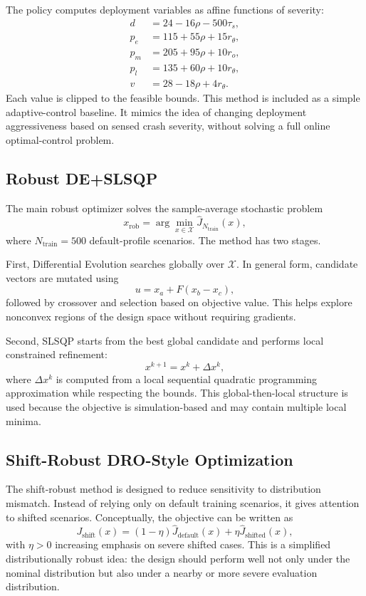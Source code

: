 \documentclass[conference]{IEEEtran}
\begin{document}
The policy computes deployment variables as affine functions of severity:
\begin{align}
d &= 24-16\rho-500\tau_s,\\
p_e &= 115+55\rho+15r_\theta,\\
p_m &= 205+95\rho+10r_o,\\
p_l &= 135+60\rho+10r_\theta,\\
v &= 28-18\rho+4r_\theta.
\end{align}
Each value is clipped to the feasible bounds. This method is included as a simple adaptive-control baseline. It mimics the idea of changing deployment aggressiveness based on sensed crash severity, without solving a full online optimal-control problem.

\subsection{Robust DE+SLSQP}
The main robust optimizer solves the sample-average stochastic problem
\begin{equation}
x_{\mathrm{rob}}=\arg\min_{x\in\mathcal{X}}\hat{J}_{N_{\mathrm{train}}}(x),
\end{equation}
where $N_{\mathrm{train}}=500$ default-profile scenarios. The method has two stages.

First, Differential Evolution searches globally over $\mathcal{X}$. In general form, candidate vectors are mutated using
\begin{equation}
u = x_a + F(x_b-x_c),
\end{equation}
followed by crossover and selection based on objective value. This helps explore nonconvex regions of the design space without requiring gradients.

Second, SLSQP starts from the best global candidate and performs local constrained refinement:
\begin{equation}
x^{k+1}=x^k+\Delta x^k,
\end{equation}
where $\Delta x^k$ is computed from a local sequential quadratic programming approximation while respecting the bounds. This global-then-local structure is used because the objective is simulation-based and may contain multiple local minima.

\subsection{Shift-Robust DRO-Style Optimization}
The shift-robust method is designed to reduce sensitivity to distribution mismatch. Instead of relying only on default training scenarios, it gives attention to shifted scenarios. Conceptually, the objective can be written as
\begin{equation}
J_{\mathrm{shift}}(x)=
(1-\eta)\hat{J}_{\mathrm{default}}(x)
+\eta\hat{J}_{\mathrm{shifted}}(x),
\end{equation}
with $\eta>0$ increasing emphasis on severe shifted cases. This is a simplified distributionally robust idea: the design should perform well not only under the nominal distribution but also under a nearby or more severe evaluation distribution.
\end{document}
